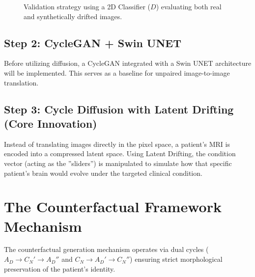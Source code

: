 \documentclass[11pt,a4paper]{article}
\begin{document}
\begin{figure}[ht]
    \centering
    \caption{Validation strategy using a 2D Classifier ($D$) evaluating both real and synthetically drifted images.}
\end{figure}

\subsection{Step 2: CycleGAN + Swin UNET}
Before utilizing diffusion, a CycleGAN integrated with a Swin UNET architecture will be implemented. This serves as a baseline for unpaired image-to-image translation.

\subsection{Step 3: Cycle Diffusion with Latent Drifting (Core Innovation)}
Instead of translating images directly in the pixel space, a patient's MRI is encoded into a compressed latent space. Using Latent Drifting, the condition vector (acting as the ''sliders'') is manipulated to simulate how that specific patient's brain would evolve under the targeted clinical condition.

\pagebreak
\section{The Counterfactual Framework Mechanism}
The counterfactual generation mechanism operates via dual cycles ($A_D \rightarrow C_N' \rightarrow A_D''$ and $C_N \rightarrow A_D' \rightarrow C_N''$) ensuring strict morphological preservation of the patient's identity.
\end{document}
